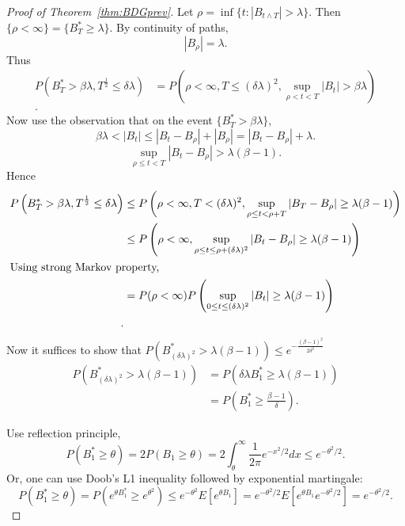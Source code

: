 \begin{proof}[Proof of Theorem~\ref{thm:BDGprev}]
	Let $\rho = \inf \{t : |B_{t \wedge T} | > \lambda\} $. Then $\{\rho < \infty \} = \{B_T^* \ge \lambda\} $. By continuity of paths,
	\[
		|B_\rho| = \lambda
	.\]
	Thus
	\begin{align*}
		P\left(B^*_T > \beta \lambda, T^{\frac{1}{2}} \le \delta \lambda\right)
		&= P\left(\rho < \infty , T \le  (\delta \lambda)^2, \sup _{\rho < t < T} |B_t| > \beta \lambda\right) \\
	.\end{align*}
	Now use the observation that on the event $\{B_T^* > \beta \lambda\} $, 
	\[
		\beta \lambda <  |B_t| \le |B_t - B_\rho| + |B_\rho| = |B_t - B_\rho| + \lambda
	.\] 
	\[
		\sup _{\rho \le  t < T} |B_t - B_\rho| > \lambda(\beta - 1)
	.\] 
	Hence
	\begin{align*}
		P\left(B^*_T > \beta \lambda, T^{\frac{1}{2}} \le \delta \lambda\right)
		&\leq P\left( \rho <  \infty , T < (\delta \lambda)^2 , \sup _{\rho \le t < \rho + T} |B_T - B_\rho| \ge  \lambda(\beta - 1) \right)  \\
		&\leq P\left(\rho < \infty ,\sup _{\rho \le  t \le  \rho + (\delta \lambda)^2} |B_t - B_\rho| \ge  \lambda (\beta - 1)\right) \\
		\intertext{Using strong Markov property,}
		&= P(\rho < \infty ) P\left( \sup _{0 \le  t \le  (\delta \lambda)^2} |B_t | \ge  \lambda(\beta - 1) \right)  \\
	.\end{align*}
	Now it suffices to show that $P\left( B^*_{(\delta\lambda)^2} > \lambda(\beta - 1) \right) \le e^{ - \frac{(\beta - 1)^2}{2 \delta^2} }$
	\begin{align*}
		P\left( B^*_{(\delta\lambda)^2} > \lambda(\beta - 1) \right) 
		&= P\left( \delta \lambda B_1^* \ge  \lambda(\beta - 1) \right)  \\
		&= P\left( B_1^* \ge  \frac{\beta -1}{\delta} \right)  
	.\end{align*}

	Use reflection principle,
	\[
		P\left( B_1^* \ge  \theta \right)
		= 2 P\left( B_1 \ge \theta \right)
		= 2 \int _ \theta ^ \infty \frac{1}{2 \pi} e^{- x^2 / 2} d x
		\le e^{- \theta^2 / 2}
		.
	\]
	Or, one can use Doob's L1 inequality followed by exponential martingale:
\[
		P\left( B_1^* \ge  \theta \right)
		= P\left( e^{\theta B_1^*} \ge e^{\theta ^2} \right) 
		\le e^{- \theta^2} E\left[ e^{\theta B_1} \right] 
		= e^{- \theta^2 / 2} E\left[ e^{\theta B_1} e^{- \theta ^2 / 2} \right] 
		= e^{- \theta^2 / 2}
		.
	\]
\end{proof}

